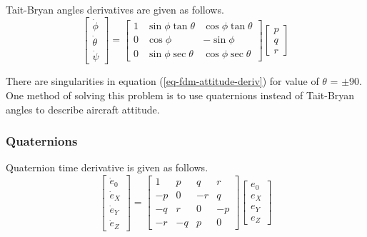 Tait-Bryan angles derivatives are given as follows. \cite{Sibilski2004, Allerton2009}
\begin{equation}
  \label{eq-fdm-attitude-deriv}
  \left[
    \begin{matrix}
      \dot \phi \\
      \dot \theta \\
      \dot \psi
    \end{matrix}
  \right]
  =
  \left[
    \begin{matrix}
      1 & \sin \phi \tan \theta & \cos \phi \tan \theta \\
      0 & \cos \phi & -\sin \phi \\
      0 & \sin \phi \sec \theta & \cos \phi \sec \theta
    \end{matrix}
  \right]
  \left[
    \begin{matrix}
      p \\
      q \\
      r
    \end{matrix}
  \right]
\end{equation}

There are singularities in equation (\ref{eq-fdm-attitude-deriv}) for value of $\theta$ = $\pm$90\degree . One method of solving this problem is to use quaternions instead of Tait-Bryan angles to describe aircraft attitude.

\subsubsection{Quaternions}

Quaternion time derivative is given as follows. \cite{Sibilski2004, StevensLewis1992}
\begin{equation}
  \label{eq-fdm-quaternion-deriv}
  \left[
    \begin{matrix}
      \dot e_0 \\
      \dot e_X \\
      \dot e_Y \\
      \dot e_Z
    \end{matrix}
  \right]
  =
  \left[
    \begin{matrix}
       1 &  p &  q &  r \\
      -p &  0 & -r &  q \\
      -q &  r &  0 & -p \\
      -r & -q &  p &  0
    \end{matrix}
  \right]
  \left[
    \begin{matrix}
      e_0 \\
      e_X \\
      e_Y \\
      e_Z
    \end{matrix}
  \right]
\end{equation}

